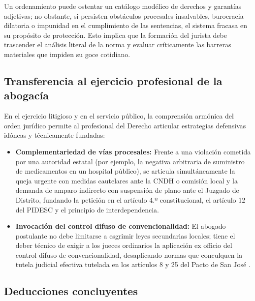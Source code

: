 \documentclass[12pt,spanish,letterpaper,oneside]{article}
\begin{document}
Un ordenamiento puede ostentar un cat\'alogo mod\'elico de derechos y garant\'ias adjetivas; no obstante, si persisten obst\'aculos procesales insalvables, burocracia dilatoria o impunidad en el cumplimiento de las sentencias, el sistema fracasa en su prop\'osito de protecci\'on. Esto implica que la formaci\'on del jurista debe trascender el an\'alisis literal de la norma y evaluar cr\'iticamente las barreras materiales que impiden su goce cotidiano.

\subsection{Transferencia al ejercicio profesional de la abogac\'ia}

En el ejercicio litigioso y en el servicio p\'ublico, la comprensi\'on arm\'onica del orden jur\'idico permite al profesional del Derecho articular estrategias defensivas id\'oneas y t\'ecnicamente fundadas:
\begin{itemize}
\item \textbf{Complementariedad de v\'ias procesales:} Frente a una violaci\'on cometida por una autoridad estatal (por ejemplo, la negativa arbitraria de suministro de medicamentos en un hospital p\'ublico), se articula simult\'aneamente la queja urgente con medidas cautelares ante la CNDH o comisi\'on local y la demanda de amparo indirecto con suspensi\'on de plano ante el Juzgado de Distrito, fundando la petici\'on en el art\'iculo 4.º constitucional, el art\'iculo 12 del PIDESC y el principio de interdependencia.
\item \textbf{Invocaci\'on del control difuso de convencionalidad:} El abogado postulante no debe limitarse a esgrimir leyes secundarias locales; tiene el deber t\'ecnico de exigir a los jueces ordinarios la aplicaci\'on ex officio del control difuso de convencionalidad, desaplicando normas que conculquen la tutela judicial efectiva tutelada en los art\'iculos 8 y 25 del Pacto de San Jos\'e \citep{oeaPacto1969ADH}.
\end{itemize}

\subsection{Deducciones concluyentes}
\end{document}
